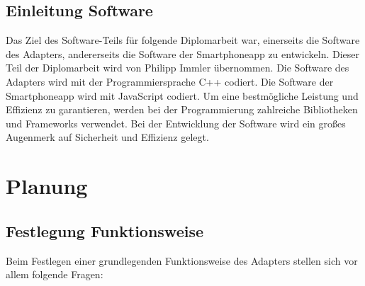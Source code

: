 \documentclass[]{article}
\begin{document}
\subsection{Einleitung Software}
Das Ziel des Software-Teils für folgende Diplomarbeit war, einerseits die Software des Adapters, andererseits die Software der Smartphoneapp zu entwickeln. Dieser Teil der Diplomarbeit wird von Philipp Immler übernommen. Die Software des Adapters wird mit der Programmiersprache C++ codiert. Die Software der Smartphoneapp wird mit JavaScript codiert. Um eine bestmögliche Leistung und Effizienz zu garantieren, werden bei der Programmierung zahlreiche Bibliotheken und Frameworks verwendet. Bei der Entwicklung der Software wird ein großes Augenmerk auf Sicherheit und Effizienz gelegt. 

\section{Planung}
\subsection{Festlegung Funktionsweise}
Beim Festlegen einer grundlegenden Funktionsweise des Adapters stellen sich vor allem folgende Fragen:
\end{document}
